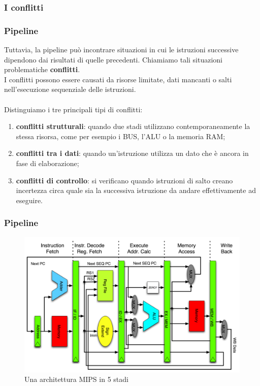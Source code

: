 \subsubsection[I conflitti]{I conflitti}
\begin{frame}
	\frametitle{ Pipeline}

		Tuttavia, la pipeline può incontrare situazioni in cui le istruzioni successive dipendono dai risultati di quelle precedenti. Chiamiamo tali situazioni problematiche \textbf{conflitti}.\\
		I conflitti possono essere causati da risorse limitate, dati mancanti o salti nell'esecuzione sequenziale delle istruzioni.\\~\\		
		Distinguiamo i tre principali tipi di conflitti:
		\begin{enumerate}
			\item \textbf{conflitti strutturali}: quando due stadi utilizzano contemporaneamente la stessa risorsa, come per esempio i BUS, l’ALU o la memoria RAM;
			\item \textbf{conflitti tra i dati}: quando un'istruzione utilizza un dato che è ancora in fase di elaborazione;
			\item \textbf{conflitti di controllo}: si verificano quando istruzioni di salto creano incertezza circa quale sia la successiva istruzione da andare effettivamente ad eseguire.
		\end{enumerate}
		
\end{frame}



\begin{frame}
	\frametitle{ Pipeline}

		\begin{figure}[!htbp]
			\centering 
			\includegraphics[width=0.82\linewidth]{images/7_pipeline/pipeline_mips_structure.png}
			\caption{Una architettura MIPS in 5 stadi}
			\label{fig:pipeline_mips_structure}
		\end{figure}

\end{frame}


